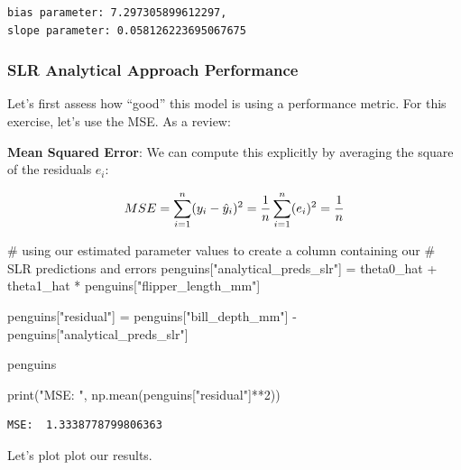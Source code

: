 \documentclass[
  letterpaper,
  DIV=11,
  numbers=noendperiod]{scrreprt}
\newenvironment{Shaded}{\begin{snugshade}}{\end{snugshade}}
\newcommand{\BuiltInTok}[1]{\textcolor[rgb]{0.00,0.23,0.31}{#1}}
\newcommand{\CommentTok}[1]{\textcolor[rgb]{0.37,0.37,0.37}{#1}}
\newcommand{\DecValTok}[1]{\textcolor[rgb]{0.68,0.00,0.00}{#1}}
\newcommand{\NormalTok}[1]{\textcolor[rgb]{0.00,0.23,0.31}{#1}}
\newcommand{\OperatorTok}[1]{\textcolor[rgb]{0.37,0.37,0.37}{#1}}
\newcommand{\StringTok}[1]{\textcolor[rgb]{0.13,0.47,0.30}{#1}}
\begin{document}
\begin{verbatim}
bias parameter: 7.297305899612297, 
slope parameter: 0.058126223695067675
\end{verbatim}

\hypertarget{slr-analytical-approach-performance}{%
\subsubsection{SLR Analytical Approach
Performance}\label{slr-analytical-approach-performance}}

Let's first assess how ``good'' this model is using a performance
metric. For this exercise, let's use the MSE. As a review:

\textbf{Mean Squared Error}: We can compute this explicitly by averaging
the square of the residuals \(e_i\):

\[\large MSE  = \sum_{i=1}^n (y_i - \hat{y}_i)^2 = \frac{1}{n}\sum_{i=1}^n (e_i)^2 = \frac{1}{n}\]

\begin{Shaded}
\begin{Highlighting}[]
\CommentTok{\# using our estimated parameter values to create a column containing our }
\CommentTok{\# SLR predictions and errors}
\NormalTok{penguins[}\StringTok{"analytical\_preds\_slr"}\NormalTok{] }\OperatorTok{=}\NormalTok{ theta0\_hat }\OperatorTok{+}\NormalTok{ theta1\_hat }\OperatorTok{*}\NormalTok{ penguins[}\StringTok{"flipper\_length\_mm"}\NormalTok{]}

\NormalTok{penguins[}\StringTok{"residual"}\NormalTok{] }\OperatorTok{=}\NormalTok{ penguins[}\StringTok{"bill\_depth\_mm"}\NormalTok{] }\OperatorTok{{-}}\NormalTok{ penguins[}\StringTok{"analytical\_preds\_slr"}\NormalTok{]}
                                          
\NormalTok{penguins}

\BuiltInTok{print}\NormalTok{(}\StringTok{"MSE: "}\NormalTok{, np.mean(penguins[}\StringTok{"residual"}\NormalTok{]}\OperatorTok{**}\DecValTok{2}\NormalTok{))}
\end{Highlighting}
\end{Shaded}

\begin{verbatim}
MSE:  1.3338778799806363
\end{verbatim}

Let's plot plot our results.
\end{document}
